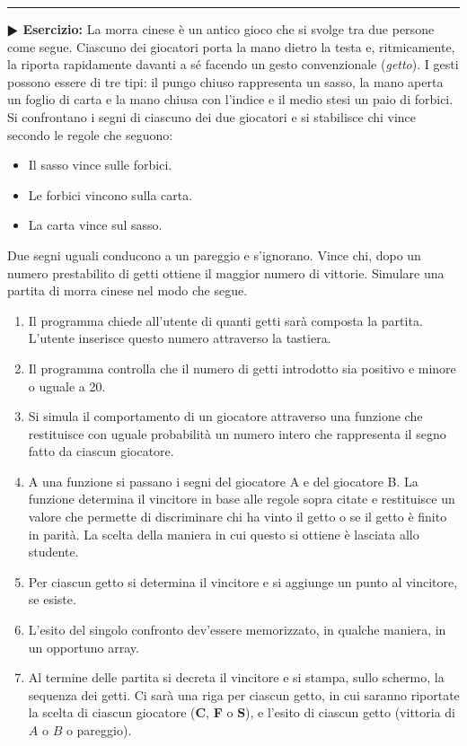 \documentclass[11pt]{article}
\begin{document}
\hrule
\vspace{2mm}
\textbf{$\RHD$ Esercizio:}
La morra cinese \`e un antico gioco che si svolge tra due persone come segue.
Ciascuno dei giocatori porta la mano dietro la testa e, ritmicamente, la riporta
rapidamente davanti a s\'e facendo un gesto convenzionale ({\em getto}). 
I gesti possono essere di tre tipi: il pungo chiuso rappresenta un sasso, la mano aperta un foglio di carta e la mano chiusa con l'indice e il medio stesi un paio di forbici. Si confrontano i segni di ciascuno dei due giocatori e si stabilisce chi vince secondo le regole che seguono:
\begin{itemize}
\item Il sasso vince sulle forbici. 
\item Le forbici vincono sulla carta.
\item La carta vince sul sasso.
\end{itemize}
Due segni uguali conducono a un pareggio e s'ignorano. Vince chi, dopo un numero prestabilito di getti ottiene il maggior numero di vittorie. Simulare una partita di morra cinese nel modo che segue.
\begin{enumerate}
\item Il programma chiede all'utente di quanti getti sar\`a composta la partita.
L'utente inserisce questo numero attraverso la tastiera.
\item Il programma controlla che il numero di getti introdotto sia positivo e minore o uguale a 20.
\item Si simula il comportamento di un giocatore attraverso una funzione che
restituisce con uguale probabilit\`a un numero intero che rappresenta il segno
fatto da ciascun giocatore.
\item  A una funzione si passano i segni del giocatore A e del giocatore B. La
funzione determina il vincitore in base alle regole sopra citate e restituisce
un valore che permette di discriminare chi ha vinto il getto o se il getto \`e finito in parit\`a. La scelta della maniera in cui questo si ottiene \`e lasciata
allo studente.
\item Per ciascun getto si determina il vincitore e si aggiunge un punto al vincitore, se esiste.
\item L'esito del singolo confronto dev'essere memorizzato, in qualche maniera,
in un opportuno array.
\item Al termine delle partita si decreta il vincitore e si stampa, sullo schermo,
la sequenza dei getti. Ci sar\`a una riga per ciascun getto,
in cui saranno riportate la scelta di ciascun giocatore ({\bf C}, {\bf F} o {\bf S}),
e l'esito di ciascun getto (vittoria di $A$ o $B$ o pareggio).

\end{enumerate}
\end{document}
